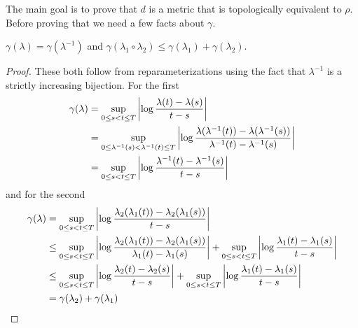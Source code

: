 The main goal is to prove that $d$ is a metric that is topologically equivalent to $\rho$.
Before proving that we need a few facts about $\gamma$.
\begin{lem}\label{SkorohodJ1GammaFacts}$\gamma(\lambda) = \gamma(\lambda^{-1})$ and
  $\gamma(\lambda_1 \circ \lambda_2) \leq \gamma(\lambda_1) +
  \gamma(\lambda_2)$.
\end{lem} 
\begin{proof}
These both follow from reparameterizations using the fact that
$\lambda^{-1}$ is a strictly increasing bijection.  For the first
\begin{align*}
\gamma(\lambda) &= 
\sup_{0 \leq s < t \leq T} \left \vert \log  \frac{\lambda(t) -
    \lambda(s)}{t-s} \right \vert \\
&=\sup_{0 \leq \lambda^{-1}(s) < \lambda^{-1}(t) \leq T} \left \vert \log
  \frac{\lambda(\lambda^{-1}(t)) -
    \lambda(\lambda^{-1}(s))}{\lambda^{-1}(t)-\lambda^{-1}(s)} \right \vert \\
&= \sup_{0 \leq s < t \leq T} \left \vert \log  \frac{\lambda^{-1}(t) - \lambda^{-1}(s)}{t-s} \right \vert 
\end{align*}
and for the second
\begin{align*}
\gamma(\lambda) &= 
\sup_{0 \leq s < t \leq T} \left \vert \log  \frac{\lambda_2(\lambda_1(t)) -
    \lambda_2(\lambda_1(s))}{t-s} \right \vert \\
&\leq \sup_{0 \leq s < t \leq T} \left \vert \log  \frac{\lambda_2(\lambda_1(t)) -
    \lambda_2(\lambda_1(s))}{\lambda_1(t)-\lambda_1(s)} \right \vert +
\sup_{0 \leq s < t \leq T} \left \vert \log  \frac{\lambda_1(t) -
    \lambda_1(s)}{t-s} \right \vert \\
&\leq \sup_{0 \leq s < t \leq T} \left \vert \log  \frac{\lambda_2(t) -
    \lambda_2(s)}{t-s} \right \vert +
\sup_{0 \leq s < t \leq T} \left \vert \log  \frac{\lambda_1(t) -
    \lambda_1(s)}{t-s} \right \vert \\
&=\gamma(\lambda_2) + \gamma(\lambda_1)
\end{align*}
\end{proof}

